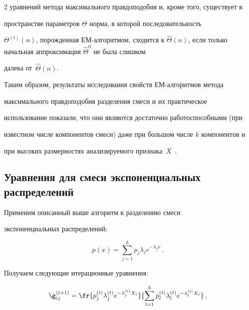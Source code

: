 \begin{multicols}{2}
уравнений метода максимального правдоподобия и, кроме того, существует в


пространстве параметров $\Theta$ норма, в которой последовательность


$\Theta^{(t)}(n)$, порожденная ЕМ-ал\-го\-рит\-мом, сходится к $\hat{\Theta}


(n)$, если только начальная аппроксимация $\hat{\Theta}^0$ не была слишком


далека от~$\hat{\Theta} (n)$. {%





}





Таким образом, результаты исследования свойств ЕМ-алгоритмов метода


максимального правдоподобия разделения смеси и их практическое


использование показали, что они являются достаточно работоспособными (при


известном чис\-ле компонентов смеси) даже при большом чис\-ле $k$ компонентов и


при высоких размерностях анализируемого признака~$X$~\cite{3bat}.





\subsection{Уравнения для смеси экспоненциальных распределений}







Применим описанный выше алгоритм к разделению смеси


экспоненциальных распределений:


$$


p(x) = \sum\limits_{j=1}^k p_j \lambda_j e^{-\lambda_j x}\,.


$$


Получаем следующие итерационные уравнения:


\begin{align*}


\g_{ij}^{(t+1)} & = \fr{p_j^{(t)}\lambda_j^{(t)}e^{-


\lambda_j^{(t)}X_i}}{\sum\limits_{l=1}^k p_l^{(t)}\lambda_l^{(t)}


e^{-\lambda_l^{(t)}X_i}}\,,\\



\end{align*}
\end{multicols}
